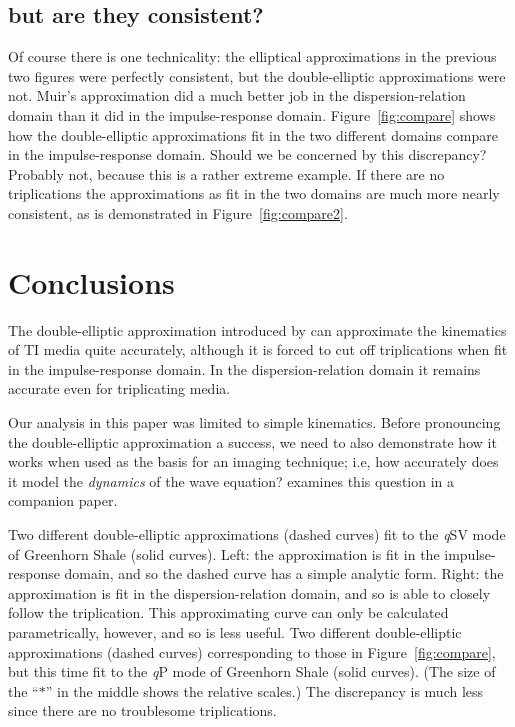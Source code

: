 \subsection{but are they consistent?}
Of course there is one technicality: the elliptical approximations in
the previous two figures were perfectly consistent, but the double-elliptic
approximations were not. Muir's approximation did a much better job
in the dispersion-relation domain than it did in the impulse-response domain.
Figure~\ref{fig:compare} shows how the double-elliptic approximations
fit in the two different domains compare in the impulse-response domain.
Should we be concerned by this discrepancy?
Probably not, because this is a rather extreme example.
If there are no triplications the
approximations as fit in the two domains are much more nearly consistent,
as is demonstrated in Figure~\ref{fig:compare2}.

\section{Conclusions}
The double-elliptic approximation introduced by \cite{Muir.sep.67.41}
can approximate the kinematics of TI media quite accurately, although
it is forced to cut off triplications when fit in the impulse-response
domain.  In the dispersion-relation domain it remains accurate even
for triplicating media.

Our analysis in this paper was limited to simple kinematics.
Before pronouncing the double-elliptic approximation
a success, we need to also demonstrate how it
works when used as the basis for an imaging technique;
i.e, how accurately does it model the {\em dynamics\/} of the wave 
equation? \cite{Karrenbach.sep.70.123} examines this question in a companion paper.

{
Two different double-elliptic approximations (dashed curves) fit
to the {\sl q}SV mode of Greenhorn Shale (solid curves).
Left: the approximation is fit in the impulse-response domain, and
so the dashed curve has a simple analytic form.
Right: the approximation is fit in the dispersion-relation domain, and
so is able to closely follow the triplication. This approximating
curve can only be calculated parametrically, however, and so is less useful.
}
{
Two different double-elliptic approximations (dashed curves) corresponding
to those in Figure~\protect\ref{fig:compare}, but this time fit
to the {\sl q}P mode of Greenhorn Shale (solid curves). (The size of the
``$*$'' in the middle shows the relative scales.)
The discrepancy is much less since there are no troublesome triplications.
}




